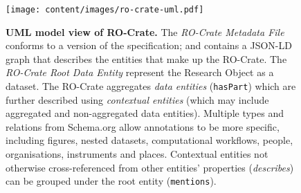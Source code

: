 
\begin{figure}[t!]
    \centering
    \texttt{[image: content/images/ro-crate-uml.pdf]}
    \caption{\textbf{UML model view of RO-Crate.} The \emph{RO-Crate Metadata File} conforms to a version of the specification; and contains a JSON-LD graph that describes the entities that make up the RO-Crate. The \emph{RO-Crate Root Data Entity} represent the Research Object as a dataset. The RO-Crate aggregates \emph{data entities} (\texttt{hasPart}) which are further described using \emph{contextual entities} (which may include aggregated and non-aggregated data entities). Multiple types and relations from Schema.org allow annotations to be more specific, including figures, nested datasets, computational workflows, people, organisations, instruments and places. Contextual entities not otherwise cross-referenced from other entities' properties (\emph{describes}) can be grouped under the root entity (\texttt{mentions}).}
    \label{fig:uml}
\end{figure}
